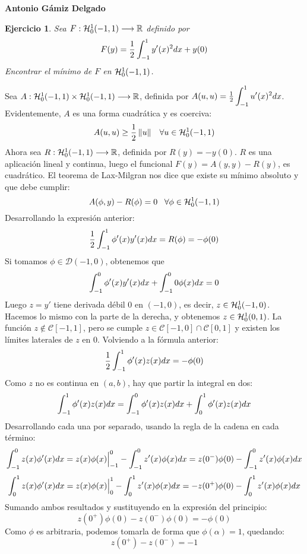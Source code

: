 \documentclass[12pt]{article}
\newtheorem{ejercicio}{Ejercicio}
\theoremstyle{definition}
\theoremstyle{remark}
\begin{document}
\textbf{Antonio Gámiz Delgado}


\begin{ejercicio}
Sea $\funcion{F}{\sobolevcero[-1,1]{1}}{\R}$ definido por
\[
F(y)=\frac{1}{2}\integral{-1}{1}{y'(x)^2dx}+y(0)
\]
Encontrar el mínimo de $F$ en $\sobolevcero[-1,1]{1}$.
\end{ejercicio}


Sea $\funcion{A}{\sobolevcero[-1,1]{1}\times \sobolevcero[-1,1]{1}}{\R}$, definida por $A(u,u)=\frac{1}{2}\integral{-1}{1}{u'(x)^2dx}$. Evidentemente, $A$ es una forma cuadrática y es coerciva:
\[
A(u,u)\geq \frac{1}{2}\norm{u} \espacio \forall u\in\sobolevcero[-1,1]{1}
\]
Ahora sea $\funcion{R}{\sobolevcero[-1,1]{1}}{\R}$, definida por $R(y)=-y(0)$. $R$ es una aplicación lineal y continua, luego el funcional $F(y)=A(y,y)-R(y)$, es cuadrático. El teorema de Lax-Milgran nos dice que existe su mínimo absoluto y que debe cumplir:
\[
A(\phi,y)-R(\phi)=0 \espacio \forall \phi\in\sobolevcero[-1,1]{1}
\]
Desarrollando la expresión anterior:
\[
\frac{1}{2}\integral{-1}{1}{\phi'(x)y'(x)dx}=R(\phi)=-\phi(0)
\]
Si tomamos $\phi\in \mathcal{D}(-1,0)$, obtenemos que 
\[
\integral{-1}{0}{\phi'(x)y'(x)dx}+\integral{-1}{0}{0\phi(x)dx}=0
\]
Luego $z=y'$ tiene derivada débil 0 en $(-1,0)$, es decir, $z\in\sobolevcero[-1,0]{1}$. Hacemos lo mismo con la parte de la derecha, y obtenemos $z\in\sobolevcero[0,1]{1}$. La función $z\notin\mathcal{C}[-1,1]$, pero se cumple $z\in\mathcal{C}[-1,0]\cap\mathcal{C}[0,1]$ y existen los límites laterales de $z$ en $0$. Volviendo a la fórmula anterior:
\[
\frac{1}{2}\integral{-1}{1}{\phi'(x)z(x)dx}=-\phi(0)
\]
Como $z$ no es continua en $(a,b)$, hay que partir la integral en dos:
\[
\integral{-1}{1}{\phi'(x)z(x)dx}=\integral{-1}{0}{\phi'(x)z(x)dx}+\integral{0}{1}{\phi'(x)z(x)dx}
\]
Desarrollando cada una por separado, usando la regla de la cadena en cada término:
\[
\integral{-1}{0}{z(x)\phi'(x)dx}=z(x)\phi(x)\Big|^0_{-1}-\integral{-1}{0}{z'(x)\phi(x)dx}=z(0^-)\phi(0)-\integral{-1}{0}{z'(x)\phi(x)dx}
\]
\[
\integral{0}{1}{z(x)\phi'(x)dx}=z(x)\phi(x)\Big|_0^{1}-\integral{0}{1}{z'(x)\phi(x)dx}=-z(0^+)\phi(0)-\integral{0}{1}{z'(x)\phi(x)dx}
\]
Sumando ambos resultados y sustituyendo en la expresión del principio:
\[
z(0^+)\phi(0)-z(0^-)\phi(0)=-\phi(0)
\]
Como $\phi$ es arbitraria, podemos tomarla de forma que $\phi(\alpha)=1$, quedando:
\[
z(0^+)-z(0^-)=-1
\]
\end{document}
